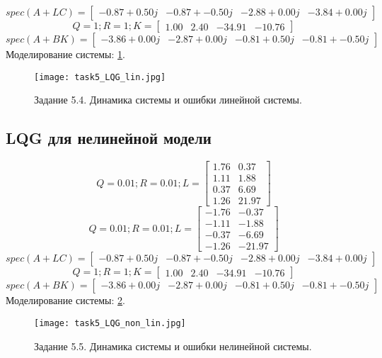        \[spec(A+LC) = \begin{bmatrix}
        -0.87 + 0.50j & -0.87 + -0.50j & -2.88 + 0.00j & -3.84 + 0.00j
       \end{bmatrix}\]
       \[Q = 1; R = 1; K= \begin{bmatrix}
         1.00 &  2.40 & -34.91 & -10.76
       \end{bmatrix}\]
       \[spec(A + BK) = \begin{bmatrix}
        -3.86 + 0.00j & -2.87 + 0.00j & -0.81 + 0.50j & -0.81 + -0.50j
       \end{bmatrix}\]
Моделирование системы: \ref{fig:task5_4}.
\begin{figure}[]
        \centering
        \texttt{[image: task5\_LQG\_lin.jpg]}
        \caption{Задание 5.4. Динамика системы и ошибки линейной системы.}
        \label{fig:task5_4}
\end{figure}


\subsection{ LQG для нелинейной модели}
\[Q = 0.01; R = 0.01; L = \begin{bmatrix}
        1.76 &  0.37\\
        1.11 &  1.88\\
        0.37 &  6.69\\
        1.26 &  21.97
      \end{bmatrix}\]
      \[Q = 0.01; R = 0.01; L = \begin{bmatrix}
       -1.76 & -0.37\\
       -1.11 & -1.88\\
       -0.37 & -6.69\\
       -1.26 & -21.97
      \end{bmatrix}\]
      \[spec(A+LC) = \begin{bmatrix}
       -0.87 + 0.50j & -0.87 + -0.50j & -2.88 + 0.00j & -3.84 + 0.00j
      \end{bmatrix}\]
      \[Q = 1; R = 1; K= \begin{bmatrix}
        1.00 &  2.40 & -34.91 & -10.76
      \end{bmatrix}\]
      \[spec(A + BK) = \begin{bmatrix}
       -3.86 + 0.00j & -2.87 + 0.00j & -0.81 + 0.50j & -0.81 + -0.50j
      \end{bmatrix}\]
Моделирование системы: \ref{fig:task5_5}.
\begin{figure}[]
        \centering
        \texttt{[image: task5\_LQG\_non\_lin.jpg]}
        \caption{Задание 5.5. Динамика системы и ошибки нелинейной системы.}
        \label{fig:task5_5}
\end{figure}
\pagebreak


